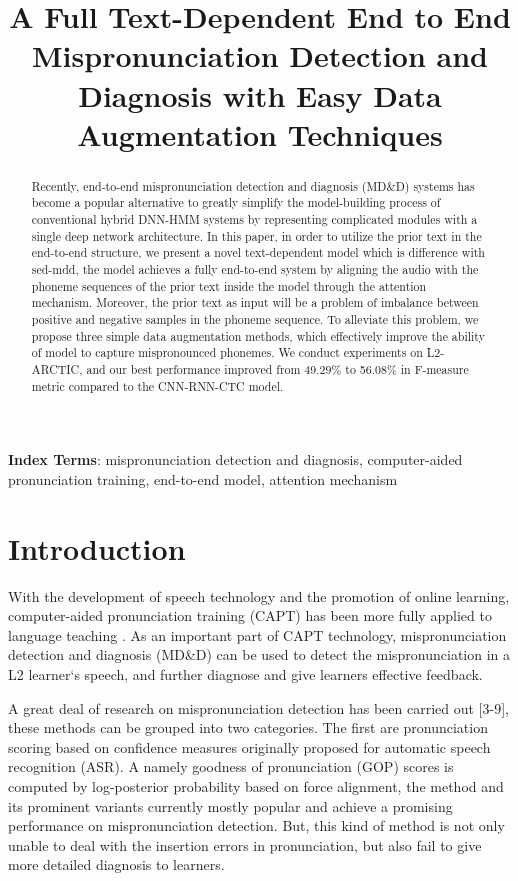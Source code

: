 \documentclass[a4paper]{article}
\title{A Full Text-Dependent End to End Mispronunciation Detection and Diagnosis with Easy Data Augmentation Techniques}
\begin{document}
\maketitle
% 
\begin{abstract}
Recently, end-to-end mispronunciation detection and diagnosis (MD\&D) systems has become a popular alternative to greatly simplify the model-building process of conventional hybrid DNN-HMM systems by representing complicated modules with a single deep network architecture. In this paper, in order to utilize the prior text in the end-to-end structure, we present a novel text-dependent model which is difference with sed-mdd, the model achieves a fully end-to-end system by aligning the audio with the phoneme sequences of the prior text inside the model through the attention mechanism. Moreover, the prior text as input will be a problem of imbalance between positive and negative samples in the phoneme sequence. To alleviate this problem, we propose three simple data augmentation methods, which effectively improve the ability of model to capture mispronounced phonemes. We conduct experiments on L2-ARCTIC, and our best performance improved from 49.29$\%$ to 56.08$\%$ in F-measure metric compared to the CNN-RNN-CTC model. 

\end{abstract}

\noindent\textbf{Index Terms}: mispronunciation detection and diagnosis, computer-aided pronunciation training, end-to-end model, attention mechanism


\section{Introduction}

With the development of speech technology and the promotion of online learning, computer-aided pronunciation training (CAPT) has been more fully applied to language teaching \cite{neri2008effectiveness,Xie2020}.  As an important part of CAPT technology, mispronunciation detection and diagnosis (MD\&D) can be used to detect the mispronunciation in a L2 learner‘s speech, and further diagnose and give learners effective feedback.

A great deal of research on mispronunciation detection has been carried out [3-9], these methods can be grouped into two categories. The first are pronunciation scoring based on confidence measures originally proposed for automatic speech recognition (ASR). A namely goodness of pronunciation (GOP) scores \cite{Witt} is computed by log-posterior probability based on force alignment, the method and its prominent variants \cite{hu,CaGOP} currently mostly popular and achieve a promising performance on mispronunciation detection. But, this kind of method is not only unable to deal with the insertion errors in pronunciation, but also fail to give more detailed diagnosis to learners. 
\end{document}
